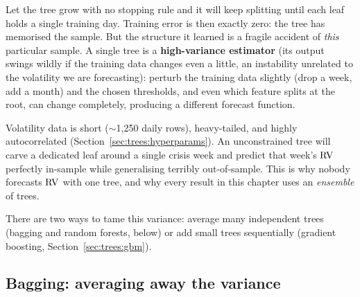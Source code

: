 Let the tree grow with no stopping rule and it will keep splitting until each
leaf holds a single training day.  Training error is then exactly zero: the
tree has memorised the sample.  But the structure it learned is a fragile
accident of \emph{this} particular sample.  A single tree is a
\textbf{high-variance estimator} (its output swings wildly if the training
data changes even a little, an instability unrelated to the volatility we are
forecasting): perturb the training data slightly
(drop a week, add a month) and the chosen thresholds, and even which feature
splits at the root, can change completely, producing a different forecast
function.

\begin{warning}
Volatility data is short ($\sim$1{,}250 daily rows), heavy-tailed, and highly
autocorrelated (Section~\ref{sec:trees:hyperparams}).  An unconstrained tree
will carve a dedicated leaf around a single crisis week and predict that
week's $\operatorname{RV}$ perfectly in-sample while generalising terribly out-of-sample.
This is why nobody forecasts $\operatorname{RV}$ with one tree, and why every result in
this chapter uses an \emph{ensemble} of trees.
\end{warning}

There are two ways to tame this variance: average many independent trees
(bagging and random forests, below) or add small trees sequentially
(gradient boosting, Section~\ref{sec:trees:gbm}).

\subsection{Bagging: averaging away the variance}

